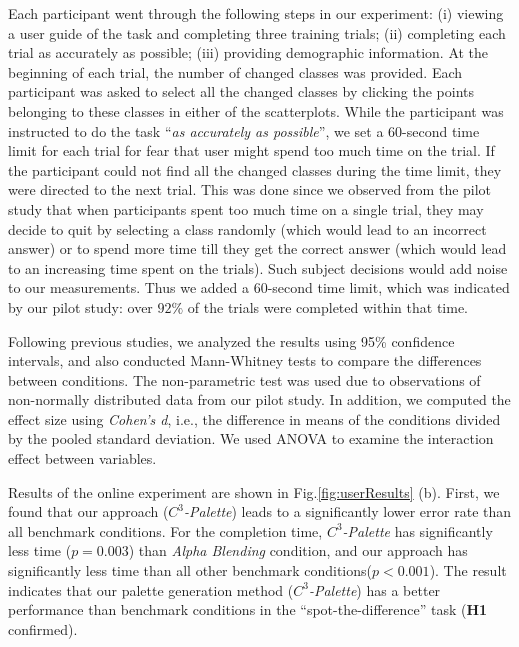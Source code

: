 {\vspace{.3em}
Each participant went through the following steps in our experiment: (i) viewing a user guide of the task and completing three training trials; (ii) completing each trial as accurately as possible; (iii) providing demographic information. At the beginning of each trial, the number of changed classes was provided. Each participant was asked to select all the changed classes by clicking the points belonging to these classes in either of the scatterplots. While the participant was instructed to do the task ``\emph{as accurately as possible}'', we set a $60$-second time limit for each trial for fear that user might spend too much time on the trial. If the participant could not find all the changed classes during the time limit, they were directed to the next trial. %
This was done since we observed from the pilot study that when participants spent too much time on a single trial, they may decide to quit by selecting a class randomly (which would lead to an incorrect answer) or to spend more time till they get the correct answer
(which would lead to an increasing time spent on the trials). Such subject decisions would add noise to our measurements. Thus we added a $60$-second time limit, which was indicated by our pilot study: over $92\%$ of the trials were completed within that time.

{}
Following previous studies, we analyzed the results using 95\% confidence intervals, and also conducted Mann-Whitney tests to compare the differences between conditions. The non-parametric test was used due to observations of non-normally distributed data from our pilot study. In addition, we computed the effect size using \emph{Cohen's d}, i.e., the difference in means of the conditions divided by the pooled standard deviation. We used ANOVA to examine the interaction effect between variables.


Results of the online experiment are shown in Fig.\ref{fig:userResults} (b).
First, we found that our approach (\emph{$C^3$-Palette}) leads to a significantly lower error rate than all benchmark conditions. For the completion time, \emph{$C^3$-Palette} has significantly less time (\emph{$p = 0.003$}) than \emph{Alpha Blending} condition, and our approach has significantly less time than all other benchmark conditions(\emph{$p < 0.001$}). The result indicates that our palette generation method (\emph{$C^3$-Palette}) has a better performance than benchmark conditions in the ``spot-the-difference'' task (\textbf{H1} confirmed).

}

